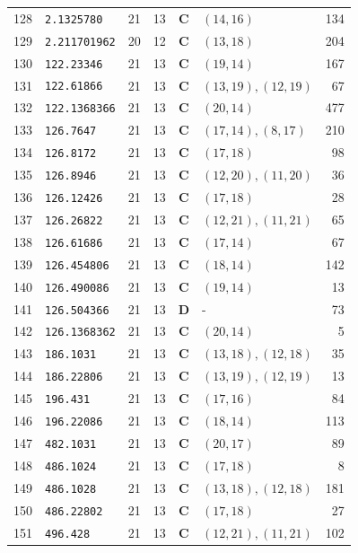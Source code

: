 \documentclass[11pt,a4paper]{article}
\begin{document}
\begin{small}
\begin{longtable}{r l c c c l r}
128 & \texttt{2.1325780} & 21 & 13 & \textbf{C} & $(14,16)$ & 134 \\
129 & \texttt{2.211701962} & 20 & 12 & \textbf{C} & $(13,18)$ & 204 \\
130 & \texttt{122.23346} & 21 & 13 & \textbf{C} & $(19,14)$ & 167 \\
131 & \texttt{122.61866} & 21 & 13 & \textbf{C} & $(13,19), (12,19)$ & 67 \\
132 & \texttt{122.1368366} & 21 & 13 & \textbf{C} & $(20,14)$ & 477 \\
133 & \texttt{126.7647} & 21 & 13 & \textbf{C} & $(17,14), (8,17)$ & 210 \\
134 & \texttt{126.8172} & 21 & 13 & \textbf{C} & $(17,18)$ & 98 \\
135 & \texttt{126.8946} & 21 & 13 & \textbf{C} & $(12,20), (11,20)$ & 36 \\
136 & \texttt{126.12426} & 21 & 13 & \textbf{C} & $(17,18)$ & 28 \\
137 & \texttt{126.26822} & 21 & 13 & \textbf{C} & $(12,21), (11,21)$ & 65 \\
138 & \texttt{126.61686} & 21 & 13 & \textbf{C} & $(17,14)$ & 67 \\
139 & \texttt{126.454806} & 21 & 13 & \textbf{C} & $(18,14)$ & 142 \\
140 & \texttt{126.490086} & 21 & 13 & \textbf{C} & $(19,14)$ & 13 \\
141 & \texttt{126.504366} & 21 & 13 & \textbf{D} & - & 73 \\
142 & \texttt{126.1368362} & 21 & 13 & \textbf{C} & $(20,14)$ & 5 \\
143 & \texttt{186.1031} & 21 & 13 & \textbf{C} & $(13,18), (12,18)$ & 35 \\
144 & \texttt{186.22806} & 21 & 13 & \textbf{C} & $(13,19), (12,19)$ & 13 \\
145 & \texttt{196.431} & 21 & 13 & \textbf{C} & $(17,16)$ & 84 \\
146 & \texttt{196.22086} & 21 & 13 & \textbf{C} & $(18,14)$ & 113 \\
147 & \texttt{482.1031} & 21 & 13 & \textbf{C} & $(20,17)$ & 89 \\
148 & \texttt{486.1024} & 21 & 13 & \textbf{C} & $(17,18)$ & 8 \\
149 & \texttt{486.1028} & 21 & 13 & \textbf{C} & $(13,18), (12,18)$ & 181 \\
150 & \texttt{486.22802} & 21 & 13 & \textbf{C} & $(17,18)$ & 27 \\
151 & \texttt{496.428} & 21 & 13 & \textbf{C} & $(12,21), (11,21)$ & 102 \\

\end{longtable}
\end{small}
\end{document}
